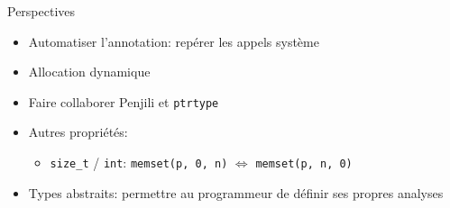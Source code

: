 \begin{frame}{Perspectives}
    \begin{itemize}
        \item Automatiser l'annotation: repérer les appels système
        \item Allocation dynamique
        \item Faire collaborer Penjili et \texttt{ptrtype}
        \item Autres propriétés:
            \begin{itemize}
                \item \texttt{size\_t} / \texttt{int}: \texttt{memset(p, 0, n)} $⇔$ \texttt{memset(p, n, 0)}
            \end{itemize}
        \item Types abstraits: permettre au programmeur de définir ses propres
            analyses
        \end{itemize}
\end{frame}
